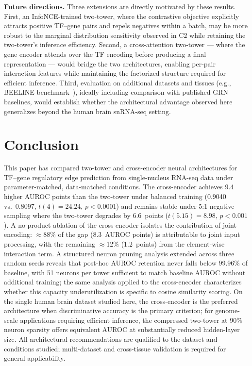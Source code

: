 \documentclass[journal]{IEEEtran}
\begin{document}
\textbf{Future directions.} Three extensions are directly motivated by these
results. First, an InfoNCE-trained two-tower, where the contrastive objective
explicitly attracts positive TF--gene pairs and repels negatives within a
batch, may be more robust to the marginal distribution sensitivity observed in
C2 while retaining the two-tower's inference efficiency. Second, a
cross-attention two-tower --- where the gene encoder attends over the TF
encoding before producing a final representation --- would bridge the two
architectures, enabling per-pair interaction features while maintaining the
factorized structure required for efficient inference. Third, evaluation on
additional datasets and tissues (e.g., BEELINE benchmark~\cite{pratapa2020}),
ideally including comparison with published GRN baselines, would establish
whether the architectural advantage observed here generalizes beyond the
human brain snRNA-seq setting.

\section{Conclusion}
\label{sec:conclusion}

This paper has compared two-tower and cross-encoder neural architectures for
TF--gene regulatory edge prediction from single-nucleus RNA-seq data under
parameter-matched, data-matched conditions. The cross-encoder achieves 9.4
higher AUROC points than the two-tower under balanced training (0.9040 vs.\
0.8097, $t(4)=24.24$, $p < 0.0001$) and remains stable under 5:1 negative
sampling where the two-tower degrades by 6.6~points ($t(5.15)=8.98$,
$p < 0.001$). A no-product ablation of the cross-encoder isolates the
contribution of joint encoding: $\approx$88\% of the gap (8.3~AUROC points) is
attributable to joint input processing, with the remaining $\approx$12\%
(1.2~points) from the element-wise interaction term. A structured neuron
pruning analysis extended across three random seeds reveals that post-hoc AUROC
retention never falls below 99.96\% of baseline, with 51 neurons per tower
sufficient to match baseline AUROC without additional training; the same
analysis applied to the cross-encoder characterizes whether this capacity
underutilization is specific to cosine similarity scoring. On the single human
brain dataset studied here, the cross-encoder is the preferred architecture
when discriminative accuracy is the primary criterion; for genome-scale
applications requiring efficient inference, the compressed two-tower at 90\%
neuron sparsity offers equivalent AUROC at substantially reduced hidden-layer
size. All architectural recommendations are qualified to the dataset and
conditions studied; multi-dataset and cross-tissue validation is required for
general applicability.



\end{document}
